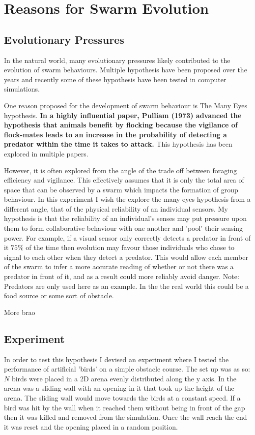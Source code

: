 \section{Reasons for Swarm Evolution}

\subsection{Evolutionary Pressures}
In the natural world, many evolutionary pressures likely contributed to the evolution of swarm behaviours. Multiple hypothesis have been proposed over the years and recently some of these hypothesis have been tested in computer simulations.\par

One reason proposed for the development of swarm behaviour is The Many Eyes hypothesis. \textbf{In a highly influential paper, Pulliam (1973) advanced the hypothesis that animals benefit by flocking because the vigilance of flock-mates leads to an increase in the probability of detecting a predator within the time it takes to attack.} This hypothesis has been explored in multiple papers. \par

However, it is often explored from the angle of the trade off between foraging efficiency and vigilance. This effectively assumes that it is only the total area of space that can be observed by a swarm which impacts the formation of group behaviour. In this experiment I wish the explore the many eyes hypothesis from a different angle, that of the physical reliability of an individual sensors. My hypothesis is that the reliability of an individual's senses may put pressure upon them to form collaborative behaviour with one another and 'pool' their sensing power. For example, if a visual sensor only correctly detects a predator in front of it $75\%$ of the time then evolution may favour those individuals who chose to signal to each other when they detect a predator. This would allow each member of the swarm to infer a more accurate reading of whether or not there was a predator in front of it, and as a result could more reliably avoid danger. Note: Predators are only used here as an example. In the the real world this could be a food source or some sort of obstacle.\par

More brao

\subsection{Experiment}
In order to test this hypothesis I devised an experiment where I tested the performance of artificial 'birds' on a simple obstacle course. The set up was as so: $N$ birds were placed in a 2D arena evenly distributed along the y axis. In the arena was a sliding wall with an opening in it that took up the height of the arena. The sliding wall would move towards the birds at a constant speed. If a bird was hit by the wall when it reached them without being in front of the gap then it was killed and removed from the simulation. Once the wall reach the end it was reset and the opening placed in a random position.\par

